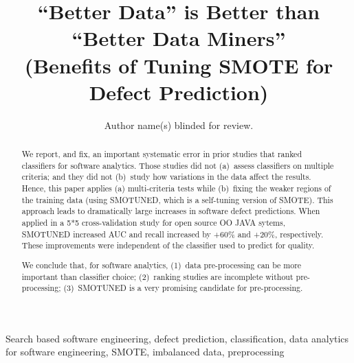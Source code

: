 \documentclass[10pt,conference]{IEEEtran}
\theoremstyle{break}
\theoremstyle{break}
\newcommand{\sma}{{\sc SMOTE}}
\newcommand{\smb}{{\sc SMOTUNED}}
\begin{document}
\pagestyle{plain}

\title{``Better Data'' is Better than ``Better Data Miners''\\ (Benefits of Tuning SMOTE for Defect Prediction) }



\author{Author name(s) blinded for review.}


\maketitle

\begin{abstract}
We report, and fix, an important systematic error in prior
studies that ranked classifiers for software analytics.
Those studies  did  not (a)~assess classifiers on multiple   criteria;
and they did not 
(b)~study  how variations in the  data affect the results. 
Hence, 
this paper applies (a)  multi-criteria tests while (b)~fixing the weaker regions of the training
 data (using {\smb}, which is a self-tuning version of {\sma}).
This approach
leads to dramatically large increases in software defect predictions.
When applied in a 5*5 cross-validation study for  open source OO
JAVA sytems,
{\smb} increased
AUC and recall increased by +60\% and +20\%, respectively. 
These improvements were independent of the  classifier used to
predict for quality.

We conclude that, for  software analytics, (1)~data
pre-processing can be more important than  classifier
choice;
(2)~ranking studies  are  incomplete  without
 pre-processing;
(3)~{\smb} is a very  promising candidate for  pre-processing.

\end{abstract}


\begin{IEEEkeywords}
Search based software engineering,
defect prediction, classification, 
data analytics for software engineering, SMOTE,  imbalanced data, preprocessing
\end{IEEEkeywords}
\end{document}
